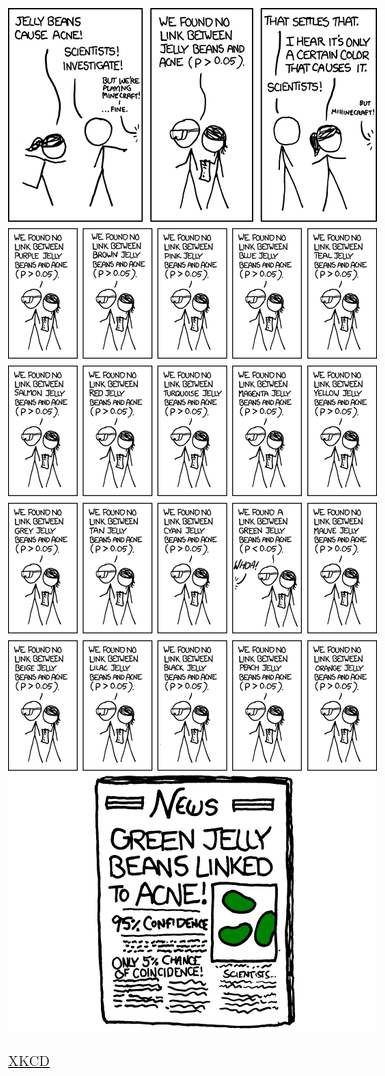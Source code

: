 \documentclass[
  9pt,
  ignorenonframetext,
]{beamer}
\begin{document}
\begin{frame}

\begin{center}\includegraphics[width=0.5\linewidth]{../fig/xkcd_Significant} \end{center}

\href{https://xkcd.com/882/}{XKCD}

\end{frame}
\end{document}
